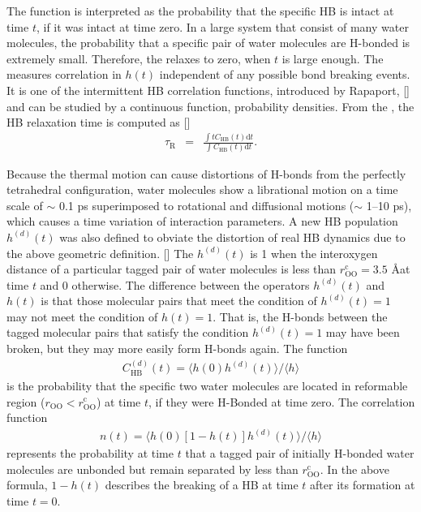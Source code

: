 The function \CHB is interpreted as the probability that the specific HB is intact at time  $t$, 
if it was intact at time zero. 
In a large system that consist of many water molecules, the probability that a specific pair of water molecules are H-bonded is extremely small. 
Therefore, the \CHB relaxes to zero, when $t$ is large enough. 
The \CHB measures correlation in $h(t)$ independent of any possible bond breaking events. 
It is one of the intermittent HB correlation functions, introduced by Rapaport, [\cite{DCR83}] 
and can be studied by a continuous function, probability densities.
From the \CHB, the HB relaxation time is computed as [\cite{Lee2007}]
\begin{eqnarray}
  \tau_{\text{R}} &=& \frac{\int t C_{\text{HB}}(t)\text{d}t}{\int C_{\text{HB}}(t)\text{d}t}.
\label{eq:tau_relaxation}
\end{eqnarray}

%
Because the thermal motion can cause distortions of H-bonds from the perfectly tetrahedral configuration,
water molecules show a librational motion on a time scale of $\sim$ 0.1 ps superimposed to rotational and diffusional motions ($\sim$ 1--10 ps), 
which causes a time variation of interaction parameters.
A new HB population $h^{(d)}(t)$ was also defined to obviate the distortion of real HB dynamics
due to the above geometric definition. [\cite{Sciortino1989,AC00}]
The $h^{(d)}(t)$ is 1 when the interoxygen distance of a particular tagged pair of water molecules is less than $r^{\text{c}}_{\text{OO}}=3.5$ \AA at time $t$ and 0 otherwise. 
The difference between the operators $h^{(d)}(t)$ and $h(t)$ is that those molecular pairs that meet the condition of $h^{(d)}(t)=1$ may not meet the condition of $h(t)=1$.
That is, the H-bonds between the tagged molecular pairs that satisfy the condition $h^{(d)}(t)=1$ may have been broken, but they may more easily form H-bonds again.
The function 
\begin{eqnarray}
  C^{(d)}_{\text{HB}}(t)=\langle h(0)h^{(d)}(t) \rangle/\langle h\rangle
\label{eq:C_HB_d}
\end{eqnarray}
is the probability that the specific two water molecules are located in reformable region ($r_{\text{OO}} < r^{\text{c}}_{\text{OO}}$) at time $t$,
if they were H-Bonded at time zero. 
The correlation function 
%
\begin{eqnarray}
n(t)=\langle h(0)[1-h(t)]h^{(d)}(t) \rangle/\langle h\rangle 
\label{eq:n_HB}
\end{eqnarray}
represents the probability at time $t$ 
that a tagged pair of initially H-bonded water molecules are unbonded but remain separated by less than $r_{\text{OO}}^{\text{c}}$.
In the above formula, $1-h(t)$ describes the breaking of a HB at time $t$ after its formation at time $t=0$.
